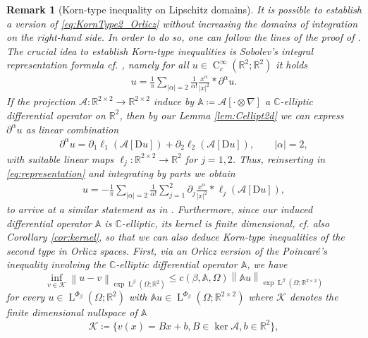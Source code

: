 \documentclass[a4paper,10pt,reqno,oneside]{amsart}
\numberwithin{equation}{section}
\newcommand{\R}{\mathbb R}
\newcommand{\C}{\mathbb C}
\newcommand{\A}{\mathscr{A}}
\newcommand{\Aop}{\mathbb{A}}
\newcommand{\lebe}{\operatorname{L}}
\newcommand{\hold}{\operatorname{C}}
\newcommand{\D}{\mathrm{D}}
\newcommand{\norm}[1]{\left\lVert#1\right\rVert}
\newcommand{\abs}[1]{\left\lvert#1\right\rvert}
\newtheorem{rem}[thm]{Remark}
\begin{document}
\begin{rem}[Korn-type inequality on Lipschitz domains]
	It is possible to establish  a version of \eqref{eq:KornType2_Orlicz} without increasing the domains of integration on the right-hand side.
	In order to do so, one can follow the lines of the proof of \cite[Thm. 3.3]{Cianchi}.
	The crucial idea to establish Korn-type inequalities is Sobolev's integral representation formula cf. \cite[Sec. 1.1.10]{Mazya}, namely for all $u\in\hold^\infty_c(\R^2;\R^2)$ it holds
	\begin{align}\label{eq:representation}
		u=\frac{1}{\pi}\sum_{\abs{\alpha}=2}\frac{1}{\alpha!}\frac{x^\alpha}{\abs{x}^2}\ast \partial^\alpha u.
	\end{align}
	If the projection $\A:\R^{2\times 2}\to\R^{2\times2}$ induce by $\Aop\coloneqq\A[\cdot\otimes\nabla]$ a $\C$-elliptic differential operator on $\R^2$, then by our Lemma \ref{lem:Cellipt2d} we can express $\partial^\alpha u$ as linear combination 
	\begin{align*}
		\partial^\alpha u = \partial_1 \ell_1(\A[\D u]) + \partial_2 \ell_2(\A[\D u]), \qquad \abs{\alpha}=2,
	\end{align*}
	with suitable linear maps $\ell_j:\R^{2\times 2} \to\R^2$ for $j=1,2$. Thus, reinserting in \eqref{eq:representation} and integrating by parts we obtain
	\begin{align*}
		u=-\frac{1}{\pi}\sum_{\abs{\alpha}=2}\frac{1}{\alpha!}\sum_{j=1}^2\partial_j\frac{x^\alpha}{\abs{x}^2}\ast \ell_j(\A[\D u]),
	\end{align*}
to arrive at a similar statement as in \cite[Eq. (6.6)]{Cianchi}.
Furthermore, since our induced differential operator $\Aop$ is $\C$-elliptic, its kernel is finite dimensional, cf. also Corollary \ref{cor:kernel}, so that we can also deduce Korn-type inequalities of the second type in Orlicz spaces. 
First, via an Orlicz version of the Poincaré's inequality involving the $\C$-elliptic differential operator $\Aop$, we have
	\begin{equation}\label{eq:Poincare2.0}
		\inf_{v\in\mathscr{K}}\norm{u-v}_{\exp\lebe^\beta(\Omega;\R^2)}\le c(\beta,\Aop,\Omega)\norm{\Aop u}_{\exp\lebe^\beta(\Omega;\R^{2\times 2})}
	\end{equation}
	for every $u\in \lebe^{\Phi_\beta}(\Omega;\R^2)$ with $\Aop u\in\lebe^{\Phi_\beta}(\Omega;\R^{2\times2})$ where $\mathscr K$ denotes the finite dimensional nullspace of $\Aop$
	\begin{equation*}
		\mathscr K \coloneqq \{ v(x)=Bx+b, B\in\ker \A, b \in\R^2 \},

\end{equation*}
\end{rem}
\end{document}
